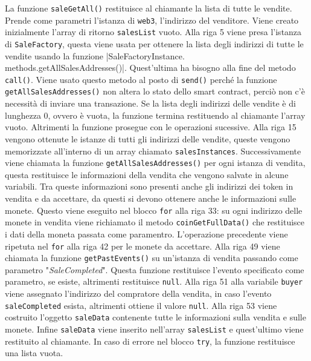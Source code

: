 \documentclass[a4paper]{article}
\begin{document}
        La funzione \verb|saleGetAll()| restituisce al chiamante la lista di tutte le vendite. Prende come parametri l'istanza di \verb|web3|, l'indirizzo del venditore.
        \newline
        Viene creato inizialmente l'array di ritorno \verb|salesList| vuoto.
        Alla riga 5 viene presa l'istanza di \verb|SaleFactory|, questa viene usata per ottenere la lista degli indirizzi di tutte le vendite usando la funzione \spverb|SaleFactoryInstance. methods.getAllSalesAddresses()|.
        Quest'ultima ha bisogno alla fine del metodo \verb|call()|. Viene usato questo metodo al posto di \verb|send()| perché la funzione \verb|getAllSalesAddresses()| non altera lo stato dello smart contract,
        perciò non c'è necessità di inviare una transazione\cite{soliditycall}.
        \newline
        Se la lista degli indirizzi delle vendite è di lunghezza 0, ovvero è vuota, la funzione termina restituendo al chiamante l'array vuoto. Altrimenti la funzione prosegue con le operazioni sucessive.
        \newline
        Alla riga 15 vengono ottenute le istanze di tutti gli indirizzi delle vendite, queste vengono memorizzate all'interno di un array chiamato \verb|salesInstances|. Successivamente viene chiamata la funzione \verb|getAllSalesAddresses()| per ogni istanza di vendita,
        questa restituisce le informazioni della vendita che vengono salvate in alcune variabili. Tra queste informazioni sono presenti anche gli indirizzi dei token in vendita e da accettare, da questi si devono ottenere anche le informazioni sulle monete.
        Questo viene eseguito nel blocco \verb|for| alla riga 33: su ogni indirizzo delle monete in vendita viene richiamato il metodo \verb|coinGetFullData()| che restituisce i dati della moneta passata come paramentro.
        L'operazione precedente viene ripetuta nel \verb|for| alla riga 42 per le monete da accettare.
        Alla riga 49 viene chiamata la funzione \verb|getPastEvents()| su un'istanza di vendita passando come parametro "\emph{SaleCompleted}". Questa funzione restituisce l'evento specificato come parametro, se esiste, altrimenti restituisce \verb|null|.
        Alla riga 51 alla variabile \verb|buyer| viene assegnato l'indirizzo del compratore della vendita, in caso l'evento \verb|saleCompleted| esista, altrimenti ottiene il valore \verb|null|.
        \newline
        Alla riga 53 viene costruito l'oggetto \verb|saleData| contenente tutte le informazioni sulla vendita e sulle monete. Infine \verb|saleData| viene inserito nell'array \verb|salesList| e quest'ultimo viene restituito al chiamante.
        \newline
        In caso di errore nel blocco \verb|try|, la funzione restituisce una lista vuota.
\end{document}
